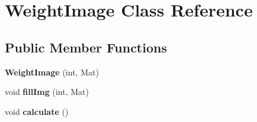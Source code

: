 \hypertarget{classWeightImage}{\section{\-Weight\-Image \-Class \-Reference}
\label{classWeightImage}
}
\subsection*{\-Public \-Member \-Functions}
\begin{DoxyCompactItemize}
\item 
\hypertarget{classWeightImage_aca25af973fdd071713b9ed73971a8ef9}{{\bfseries \-Weight\-Image} (int, \-Mat)}\label{classWeightImage_aca25af973fdd071713b9ed73971a8ef9}

\item 
\hypertarget{classWeightImage_ab1cb5407d869017ff76ee38ab52fc631}{void {\bfseries fill\-Img} (int, \-Mat)}\label{classWeightImage_ab1cb5407d869017ff76ee38ab52fc631}

\item 
\hypertarget{classWeightImage_aecd8990a967993eeee9403a0e0987cf5}{void {\bfseries calculate} ()}\label{classWeightImage_aecd8990a967993eeee9403a0e0987cf5}

\end{DoxyCompactItemize}
